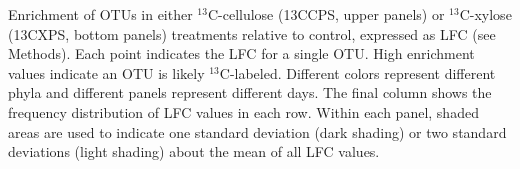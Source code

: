 Enrichment of OTUs in either $^{13}$C-cellulose (13CCPS, upper panels) or
$^{13}$C-xylose (13CXPS, bottom panels) treatments relative to control,
expressed as LFC (see Methods). Each point indicates the LFC for a single OTU.
High enrichment values indicate an OTU is likely $^{13}$C-labeled. Different
colors represent different phyla and different panels represent different days.
The final column shows the frequency distribution of LFC values in each row.
Within each panel, shaded areas are used to indicate one standard deviation
(dark shading) or two standard deviations (light shading) about the mean of all
LFC values.

